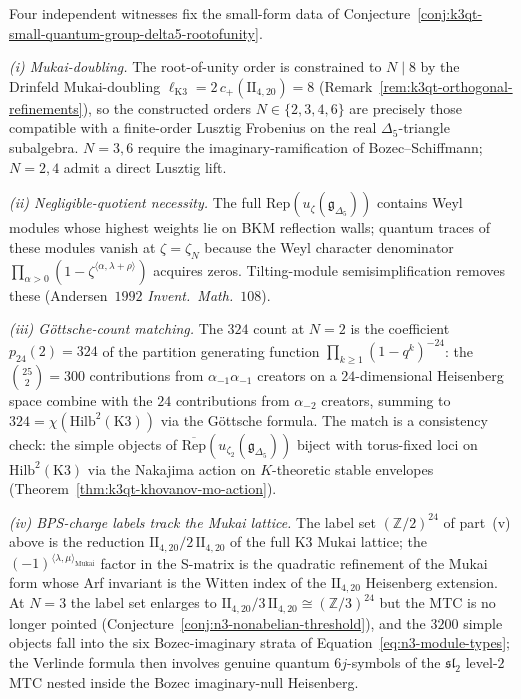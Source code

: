 \begin{remark}
\label{rem:k3qt-small-qgroup-consistency}
Four independent witnesses fix the small-form data of
Conjecture~\ref{conj:k3qt-small-quantum-group-delta5-rootofunity}.

\emph{(i) Mukai-doubling.} The root-of-unity order is constrained to
$N \mid 8$ by the Drinfeld Mukai-doubling
$\ell_{\mathrm{K3}} = 2\,c_+(\mathrm{II}_{4, 20}) = 8$
(Remark~\ref{rem:k3qt-orthogonal-refinements}), so the constructed
orders $N \in \{2, 3, 4, 6\}$ are precisely those compatible with a
finite-order Lusztig Frobenius on the real $\Delta_5$-triangle
subalgebra. $N = 3, 6$ require the imaginary-ramification of
Bozec--Schiffmann; $N = 2, 4$ admit a direct Lusztig lift.

\emph{(ii) Negligible-quotient necessity.} The full
$\mathrm{Rep}(u_\zeta(\mathfrak g_{\Delta_5}))$ contains Weyl modules
whose highest weights lie on BKM reflection walls; quantum traces of
these modules vanish at $\zeta = \zeta_N$ because the Weyl character
denominator $\prod_{\alpha > 0}(1 - \zeta^{\langle\alpha, \lambda + \rho\rangle})$
acquires zeros. Tilting-module semisimplification removes these
(Andersen~$1992$ \emph{Invent.~Math.}~$108$).

\emph{(iii) G\"ottsche-count matching.} The $324$ count at $N = 2$
is the coefficient $p_{24}(2) = 324$ of the partition generating
function $\prod_{k \geq 1}(1 - q^k)^{-24}$: the $\binom{25}{2} = 300$
contributions from $\alpha_{-1}\alpha_{-1}$ creators on a
$24$-dimensional Heisenberg space combine with the $24$
contributions from $\alpha_{-2}$ creators, summing to $324 =
\chi(\mathrm{Hilb}^2(\mathrm{K3}))$ via the G\"ottsche formula. The match is a consistency check: the simple objects of
$\overline{\mathrm{Rep}}(u_{\zeta_2}(\mathfrak g_{\Delta_5}))$ biject
with torus-fixed loci on $\mathrm{Hilb}^2(\mathrm K3)$ via the
Nakajima action on $K$-theoretic stable envelopes
(Theorem~\ref{thm:k3qt-khovanov-mo-action}).

\emph{(iv) BPS-charge labels track the Mukai lattice.} The label set
$(\mathbb Z/2)^{24}$ of part~(v) above is the reduction
$\mathrm{II}_{4, 20}/2\,\mathrm{II}_{4, 20}$ of the full K3 Mukai
lattice; the $(-1)^{\langle\lambda, \mu\rangle_{\mathrm{Mukai}}}$
factor in the S-matrix is the quadratic refinement of the Mukai form
whose Arf invariant is the Witten index of the $\mathrm{II}_{4, 20}$
Heisenberg extension. At $N = 3$ the label set enlarges to
$\mathrm{II}_{4, 20}/3\,\mathrm{II}_{4, 20} \cong (\mathbb Z/3)^{24}$
but the MTC is no longer pointed
(Conjecture~\ref{conj:n3-nonabelian-threshold}), and the $3200$ simple
objects fall into the six Bozec-imaginary strata of
Equation~\eqref{eq:n3-module-types}; the Verlinde formula then involves
genuine quantum $6j$-symbols of the $\mathfrak{sl}_2$ level-$2$ MTC
nested inside the Bozec imaginary-null Heisenberg.


\end{remark}
